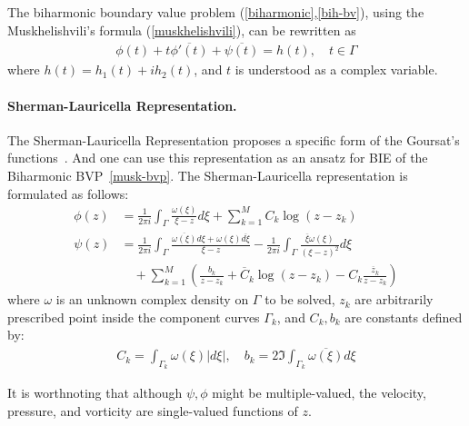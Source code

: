 \documentclass[10pt,twocolumn,letterpaper]{article}
\begin{document}
The biharmonic boundary value problem (\ref{biharmonic},\ref{bih-bv}), using
the Muskhelishvili's formula (\ref{muskhelishvili}), can be rewritten as
\begin{align}
  \phi(t) + t\overline{\phi'(t)} + \overline{\psi(t)}
  = h(t), \quad
  t \in \Gamma \label{musk-bvp}
\end{align} where $h(t) =  h_1(t) + ih_2(t)$,  and $t$ is understood as a complex variable.

\paragraph*{Sherman-Lauricella Representation.} The Sherman-Lauricella
Representation proposes a specific form of the Goursat's functions~\cite{greengardIntegralEquationMethods1996}. 
And one can use this representation as an ansatz for BIE of the Biharmonic BVP~\eqref{musk-bvp}. The
Sherman-Lauricella representation is formulated as follows:
\begin{align}
  \phi(z) & =
  \frac {1}{2\pi i} \int_\Gamma \frac{\omega(\xi)}{\xi - z} d\xi
  + \sum_{k=1}^M C_k \log (z-z_k) \label{sl-phi}
  \\
  \psi(z) & =
  \frac {1}{2\pi i} \int_\Gamma \frac{\overline{\omega(\xi)}d\xi +  \omega(\xi)\overline{d\xi}}{\xi - z}
  - \frac {1}{2\pi i} \int_\Gamma \frac{\overline{\xi} \omega(\xi)}{{(\xi - z)}^2} d\xi  \label{sl-psi}
  \\
          & \quad + \sum _{k=1}^M
  \left( \frac{b_k}{z-z_k} + \overline C_k \log (z-z_k) -  C_k \frac{\overline z_k}{z-z_k} \right) \nonumber
\end{align}
where $\omega$ is an unknown complex density on $\Gamma$ to be solved,
$z_k$ are arbitrarily prescribed point inside the component curves $\Gamma_k$,
and $C_k, b_k$ are constants defined by:
\begin{align}
  C_k = \int_{\Gamma_k} \omega(\xi) |d\xi|, \quad b_k = 2 \Im\int_{\Gamma_k} \overline{\omega(\xi)} {d\xi}
\end{align}

It is worthnoting that although $\psi, \phi$ might be multiple-valued, 
the velocity, pressure, and vorticity are single-valued functions of $z$.
\end{document}
